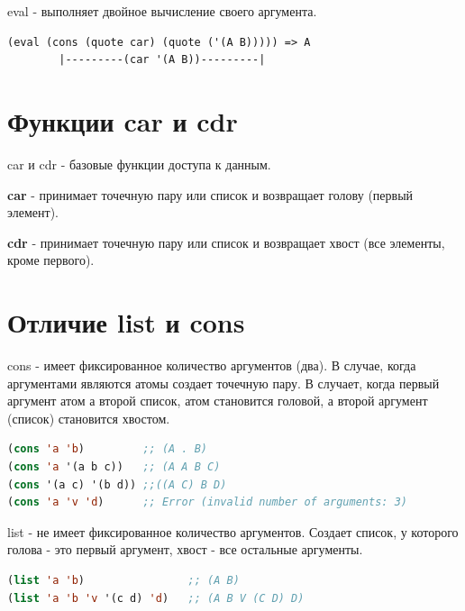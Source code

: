 eval - выполняет двойное вычисление своего аргумента.

\begin{lstlisting}
(eval (cons (quote car) (quote ('(A B))))) => A
		|---------(car '(A B))---------|

\end{lstlisting}


\section{Функции car и cdr}

car и cdr - базовые функции доступа к данным. 

\textbf{car} - принимает точечную пару или список и возвращает голову (первый элемент).

\textbf{cdr} - принимает точечную пару или список и возвращает хвост (все элементы, кроме первого).

\section{Отличие list и cons}

cons - имеет фиксированное количество аргументов (два). 
В случае, когда аргументами являются атомы создает точечную пару.
В случает, когда первый аргумент атом а второй список, атом становится головой,
а второй аргумент (список) становится хвостом. 
\begin{lstlisting}[language=Lisp]
(cons 'a 'b) 		 ;; (A . B)
(cons 'a '(a b c)) 	 ;; (A A B C)
(cons '(a c) '(b d)) ;;((A C) B D)
(cons 'a 'v 'd)  	 ;; Error (invalid number of arguments: 3)
\end{lstlisting}

\begin{figure}[ht!]
\end{figure}

list - не имеет фиксированное количество аргументов. 
Создает список, у которого голова - это первый аргумент,
хвост - все остальные аргументы.
\begin{lstlisting}[language=Lisp]
(list 'a 'b) 				;; (A B)
(list 'a 'b 'v '(c d) 'd) 	;; (A B V (C D) D)
\end{lstlisting}

